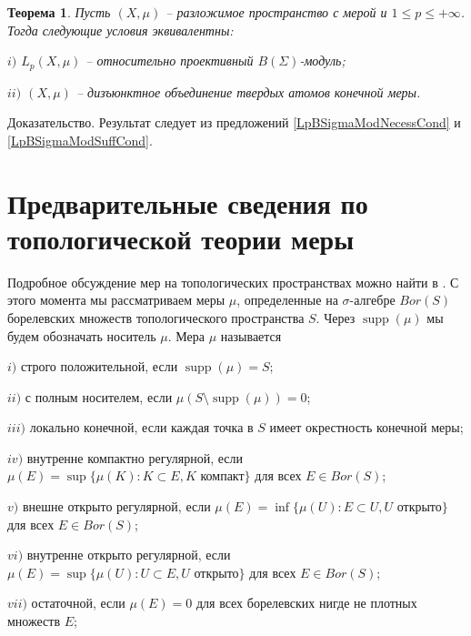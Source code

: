 \documentclass[12pt]{article}
\numberwithin{equation}{subsection}
\theoremstyle{plain}
\newtheorem{theorem}{Теорема}
\newenvironment{proof}{Доказательство.}{}
\begin{document}
\begin{fulltext}
    \begin{theorem}\label{LpBSigmaModCrit} Пусть $(X,\mu)$ -- разложимое пространство с мерой и $1\leq p\leq +\infty$. Тогда следующие условия эквивалентны:

        $i)$ $L_p(X,\mu)$ -- относительно проективный $B(\Sigma)$-модуль;

        $ii)$ $(X,\mu)$ -- дизъюнктное объединение твердых атомов конечной меры.
    \end{theorem}
    \begin{proof} Результат следует из предложений \ref{LpBSigmaModNecessCond} и \ref{LpBSigmaModSuffCond}.
    \end{proof}


    \section{Предварительные сведения по топологической теории меры}
    \label{SectionPreliminariesOnTopologicalMeasureTheory}

    Подробное обсуждение мер на топологических пространствах можно найти в \cite{FremMeasTh4.1}. С этого момента мы рассматриваем меры $\mu$, определенные на $\sigma$-алгебре $Bor(S)$ борелевских множеств топологического пространства $S$. Через $\operatorname{supp}(\mu)$ мы будем обозначать носитель $\mu$. Мера $\mu$ называется

    $i)$ строго положительной, если $\operatorname{supp}(\mu)=S$;

    $ii)$ с полным носителем, если $\mu(S\setminus\operatorname{supp}(\mu))=0$;

    $iii)$ локально конечной, если каждая точка в $S$ имеет окрестность конечной меры;

    $iv)$ внутренне компактно регулярной, если $\mu(E)=\sup\{\mu(K): K\subset E, K\mbox{ компакт}\}$
    для всех $E\in Bor(S)$;

    $v)$ внешне открыто регулярной, если $\mu(E)=\inf\{\mu(U): E\subset U, U\mbox{ открыто}\}$ для всех $E\in Bor(S)$;

    $vi)$ внутренне открыто регулярной, если $\mu(E)=\sup\{\mu(U): U\subset E, U\mbox{ открыто}\}$ для всех $E\in Bor(S)$;

    $vii)$ остаточной, если $\mu(E)=0$ для всех борелевских нигде не плотных множеств $E$;


\end{fulltext}
\end{document}
